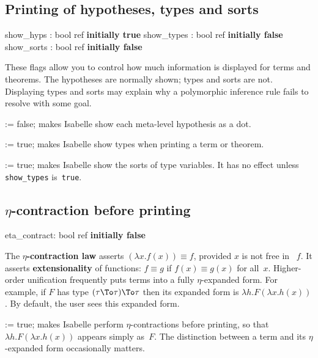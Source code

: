 \subsection{Printing of hypotheses, types and sorts}
\begin{ttbox} 
show_hyps  : bool ref \hfill{\bf initially true}
show_types : bool ref \hfill{\bf initially false}
show_sorts : bool ref \hfill{\bf initially false}
\end{ttbox}
These flags allow you to control how much information is displayed for
terms and theorems.  The hypotheses are normally shown; types and sorts are
not.  Displaying types and sorts may explain why a polymorphic inference
rule fails to resolve with some goal.

\begin{ttdescription}
\item[\ttindexbold{show_hyps} := false;]   
makes Isabelle show each meta-level hypothesis as a dot.

\item[\ttindexbold{show_types} := true;]
makes Isabelle show types when printing a term or theorem.

\item[\ttindexbold{show_sorts} := true;]
makes Isabelle show the sorts of type variables.  It has no effect unless
{\tt show_types} is~{\tt true}. 
\end{ttdescription}


\subsection{$\eta$-contraction before printing}
\begin{ttbox} 
eta_contract: bool ref \hfill{\bf initially false}
\end{ttbox}
The {\bf $\eta$-contraction law} asserts $(\lambda x.f(x))\equiv f$,
provided $x$ is not free in ~$f$.  It asserts {\bf extensionality} of
functions: $f\equiv g$ if $f(x)\equiv g(x)$ for all~$x$.  Higher-order
unification frequently puts terms into a fully $\eta$-expanded form.  For
example, if $F$ has type $(\tau\To\tau)\To\tau$ then its expanded form is
$\lambda h.F(\lambda x.h(x))$.  By default, the user sees this expanded
form.

\begin{ttdescription}
\item[\ttindexbold{eta_contract} := true;]
makes Isabelle perform $\eta$-contractions before printing, so that
$\lambda h.F(\lambda x.h(x))$ appears simply as~$F$.  The
distinction between a term and its $\eta$-expanded form occasionally
matters.
\end{ttdescription}


